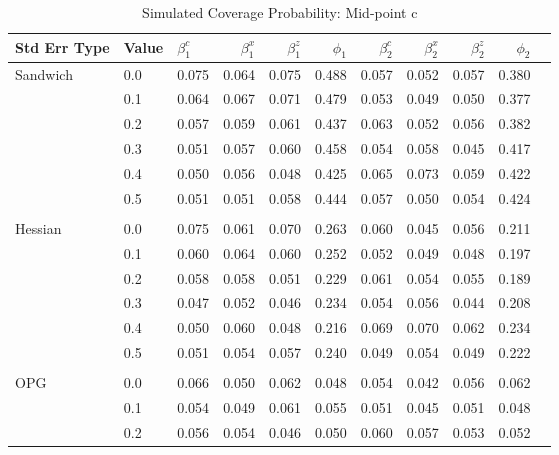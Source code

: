 \documentclass[12pt]{article}
\theoremstyle{definition}
\begin{document}
\begin{table}[b!] \centering
  \caption{Simulated Coverage Probability: Mid-point c}
  \begin{threeparttable}
    {\footnotesize
    \begin{tabular}[r]{l l l r r r r r r r r}
  \hline
Std Err Type & Value & $\beta_{1}^{c}$ & $\beta_{1}^{x}$ & $\beta_{1}^{z}$ & $\phi_{1}$ & $\beta_{2}^{c}$ & $\beta_{2}^{x}$ & $\beta_{2}^{z}$ & $\phi_{2}$ \\ 
  \hline

Sandwich  & 0.0 & 0.075 & 0.064 & 0.075 & 0.488 & 0.057 & 0.052 & 0.057 & 0.380 \\
          & 0.1 & 0.064 & 0.067 & 0.071 & 0.479 & 0.053 & 0.049 & 0.050 & 0.377 \\
          & 0.2 & 0.057 & 0.059 & 0.061 & 0.437 & 0.063 & 0.052 & 0.056 & 0.382 \\
          & 0.3 & 0.051 & 0.057 & 0.060 & 0.458 & 0.054 & 0.058 & 0.045 & 0.417 \\
          & 0.4 & 0.050 & 0.056 & 0.048 & 0.425 & 0.065 & 0.073 & 0.059 & 0.422 \\
          & 0.5 & 0.051 & 0.051 & 0.058 & 0.444 & 0.057 & 0.050 & 0.054 & 0.424 \\
          &     &       &       &       &       &       &       &       &       \\
Hessian   & 0.0 & 0.075 & 0.061 & 0.070 & 0.263 & 0.060 & 0.045 & 0.056 & 0.211 \\
          & 0.1 & 0.060 & 0.064 & 0.060 & 0.252 & 0.052 & 0.049 & 0.048 & 0.197 \\
          & 0.2 & 0.058 & 0.058 & 0.051 & 0.229 & 0.061 & 0.054 & 0.055 & 0.189 \\
          & 0.3 & 0.047 & 0.052 & 0.046 & 0.234 & 0.054 & 0.056 & 0.044 & 0.208 \\
          & 0.4 & 0.050 & 0.060 & 0.048 & 0.216 & 0.069 & 0.070 & 0.062 & 0.234 \\
          & 0.5 & 0.051 & 0.054 & 0.057 & 0.240 & 0.049 & 0.054 & 0.049 & 0.222 \\
          &     &       &       &       &       &       &       &       &       \\
OPG       & 0.0 & 0.066 & 0.050 & 0.062 & 0.048 & 0.054 & 0.042 & 0.056 & 0.062 \\
          & 0.1 & 0.054 & 0.049 & 0.061 & 0.055 & 0.051 & 0.045 & 0.051 & 0.048 \\
          & 0.2 & 0.056 & 0.054 & 0.046 & 0.050 & 0.060 & 0.057 & 0.053 & 0.052 \\

\end{tabular}}
\end{threeparttable}
\end{table}
\end{document}
